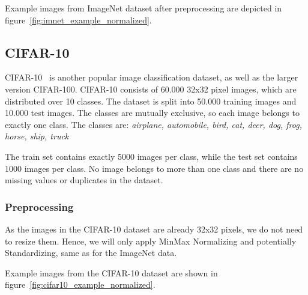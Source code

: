 Example images from ImageNet dataset after preprocessing are depicted in figure~\ref{fig:imnet_example_normalized}.

\subsection{CIFAR-10}\label{subsec:cifar-10}
CIFAR-10~\cite{cifar10} is another popular image classification dataset, as well as the larger version CIFAR-100.
CIFAR-10 consists of 60.000 32x32 pixel images, which are distributed over 10 classes.
The dataset is split into 50.000 training images and 10.000 test images.
The classes are mutually exclusive, so each image belongs to exactly one class.
The classes are: \textit{airplane, automobile, bird, cat, deer, dog, frog, horse, ship, truck}

The train set contains exactly 5000 images per class, while the test set contains 1000 images per class.
No image belongs to more than one class and there are no missing values or duplicates in the dataset.

\subsubsection{Preprocessing}
As the images in the CIFAR-10 dataset are already 32x32 pixels, we do not need to resize them.
Hence, we will only apply MinMax Normalizing and potentially Standardizing, same as for the ImageNet data.

Example images from the CIFAR-10 dataset are shown in figure~\ref{fig:cifar10_example_normalized}.
